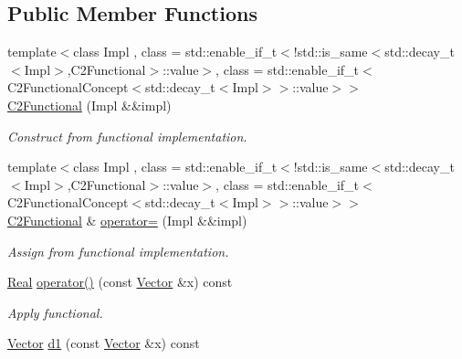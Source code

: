 \subsection*{Public Member Functions}
\begin{DoxyCompactItemize}
\item 
\hypertarget{classSpacy_1_1C2Functional_a94ac0d65981636c140846bde427b28ac}{}{\footnotesize template$<$class Impl , class  = std\+::enable\+\_\+if\+\_\+t$<$!std\+::is\+\_\+same$<$std\+::decay\+\_\+t$<$\+Impl$>$,\+C2\+Functional$>$\+::value$>$, class  = std\+::enable\+\_\+if\+\_\+t$<$\+C2\+Functional\+Concept$<$std\+::decay\+\_\+t$<$\+Impl$>$$>$\+::value$>$$>$ }\\\hyperlink{classSpacy_1_1C2Functional_a94ac0d65981636c140846bde427b28ac}{C2\+Functional} (Impl \&\&impl)\label{classSpacy_1_1C2Functional_a94ac0d65981636c140846bde427b28ac}

\begin{DoxyCompactList}\small\item\em Construct from functional implementation. \end{DoxyCompactList}\item 
\hypertarget{classSpacy_1_1C2Functional_ae87fd8e33cfdfb00de5b341f85b0b319}{}{\footnotesize template$<$class Impl , class  = std\+::enable\+\_\+if\+\_\+t$<$!std\+::is\+\_\+same$<$std\+::decay\+\_\+t$<$\+Impl$>$,\+C2\+Functional$>$\+::value$>$, class  = std\+::enable\+\_\+if\+\_\+t$<$\+C2\+Functional\+Concept$<$std\+::decay\+\_\+t$<$\+Impl$>$$>$\+::value$>$$>$ }\\\hyperlink{classSpacy_1_1C2Functional}{C2\+Functional} \& \hyperlink{classSpacy_1_1C2Functional_ae87fd8e33cfdfb00de5b341f85b0b319}{operator=} (Impl \&\&impl)\label{classSpacy_1_1C2Functional_ae87fd8e33cfdfb00de5b341f85b0b319}

\begin{DoxyCompactList}\small\item\em Assign from functional implementation. \end{DoxyCompactList}\item 
\hypertarget{classSpacy_1_1C2Functional_a5dad5f40836b6f43662db0a01fd32347}{}\hyperlink{classSpacy_1_1Real}{Real} \hyperlink{classSpacy_1_1C2Functional_a5dad5f40836b6f43662db0a01fd32347}{operator()} (const \hyperlink{classSpacy_1_1Vector}{Vector} \&x) const \label{classSpacy_1_1C2Functional_a5dad5f40836b6f43662db0a01fd32347}

\begin{DoxyCompactList}\small\item\em Apply functional. \end{DoxyCompactList}\item 
\hypertarget{classSpacy_1_1C2Functional_a7278ddf3337cc28d138a02d18ad44404}{}\hyperlink{classSpacy_1_1Vector}{Vector} \hyperlink{classSpacy_1_1C2Functional_a7278ddf3337cc28d138a02d18ad44404}{d1} (const \hyperlink{classSpacy_1_1Vector}{Vector} \&x) const \label{classSpacy_1_1C2Functional_a7278ddf3337cc28d138a02d18ad44404}


\end{DoxyCompactItemize}

